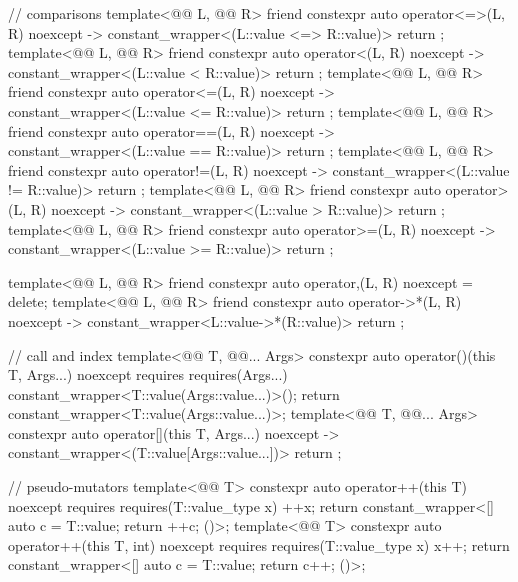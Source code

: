 \begin{codeblock}
{{    // comparisons
    template<@@ L, @@ R>
      friend constexpr auto operator<=>(L, R) noexcept
        -> constant_wrapper<(L::value <=> R::value)>
          { return {}; }
    template<@@ L, @@ R>
      friend constexpr auto operator<(L, R) noexcept -> constant_wrapper<(L::value < R::value)>
        { return {}; }
    template<@@ L, @@ R>
      friend constexpr auto operator<=(L, R) noexcept -> constant_wrapper<(L::value <= R::value)>
        { return {}; }
    template<@@ L, @@ R>
      friend constexpr auto operator==(L, R) noexcept -> constant_wrapper<(L::value == R::value)>
        { return {}; }
    template<@@ L, @@ R>
      friend constexpr auto operator!=(L, R) noexcept -> constant_wrapper<(L::value != R::value)>
        { return {}; }
    template<@@ L, @@ R>
      friend constexpr auto operator>(L, R) noexcept -> constant_wrapper<(L::value > R::value)>
        { return {}; }
    template<@@ L, @@ R>
      friend constexpr auto operator>=(L, R) noexcept -> constant_wrapper<(L::value >= R::value)>
        { return {}; }

    template<@@ L, @@ R>
      friend constexpr auto operator,(L, R) noexcept = delete;
    template<@@ L, @@ R>
      friend constexpr auto operator->*(L, R) noexcept -> constant_wrapper<L::value->*(R::value)>
        { return {}; }

    // call and index
    template<@@ T, @@... Args>
      constexpr auto operator()(this T, Args...) noexcept
        requires requires(Args...) { constant_wrapper<T::value(Args::value...)>(); }
          { return constant_wrapper<T::value(Args::value...)>{}; }
    template<@@ T, @@... Args>
      constexpr auto operator[](this T, Args...) noexcept
        -> constant_wrapper<(T::value[Args::value...])>
          { return {}; }

    // pseudo-mutators
    template<@@ T>
      constexpr auto operator++(this T) noexcept
        requires requires(T::value_type x) { ++x; }
          { return constant_wrapper<[] { auto c = T::value; return ++c; }()>{}; }
    template<@@ T>
      constexpr auto operator++(this T, int) noexcept
        requires requires(T::value_type x) { x++; }
          { return constant_wrapper<[] { auto c = T::value; return c++; }()>{}; }

}}
\end{codeblock}
